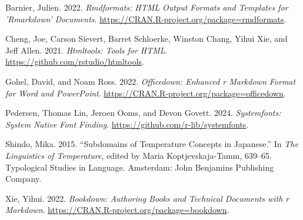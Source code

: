 \documentclass[
]{article}
\newlength{\cslhangindent}
\newlength{\cslentryspacingunit} %
\newenvironment{CSLReferences}[2] %
 {%
  \setlength{\parindent}{0pt}
  \ifodd #1
  \let\oldpar\par
  \def\par{\hangindent=\cslhangindent\oldpar}
  \fi
  \setlength{\parskip}{#2\cslentryspacingunit}
 }%
 {}
\begin{document}
\hypertarget{refs}{}
\begin{CSLReferences}{1}{0}
\leavevmode{}%
Barnier, Julien. 2022. \emph{Rmdformats: HTML Output Formats and Templates for 'Rmarkdown' Documents}. \url{https://CRAN.R-project.org/package=rmdformats}.

\leavevmode{}%
Cheng, Joe, Carson Sievert, Barret Schloerke, Winston Chang, Yihui Xie, and Jeff Allen. 2021. \emph{Htmltools: Tools for HTML}. \url{https://github.com/rstudio/htmltools}.

\leavevmode{}%
Gohel, David, and Noam Ross. 2022. \emph{Officedown: Enhanced r Markdown Format for Word and PowerPoint}. \url{https://CRAN.R-project.org/package=officedown}.

\leavevmode{}%
Pedersen, Thomas Lin, Jeroen Ooms, and Devon Govett. 2024. \emph{Systemfonts: System Native Font Finding}. \url{https://github.com/r-lib/systemfonts}.

\leavevmode{}%
Shindo, Mika. 2015. {``Subdomains of Temperature Concepts in {Japanese}.''} In \emph{The {Linguistics} of {Temperature}}, edited by Maria Koptjevskaja-Tamm, 639--65. Typological {Studies} in {Language}. {Amsterdam}: {John Benjamins Publishing Company}.

\leavevmode{}%
Xie, Yihui. 2022. \emph{Bookdown: Authoring Books and Technical Documents with r Markdown}. \url{https://CRAN.R-project.org/package=bookdown}.

\end{CSLReferences}
\end{document}
